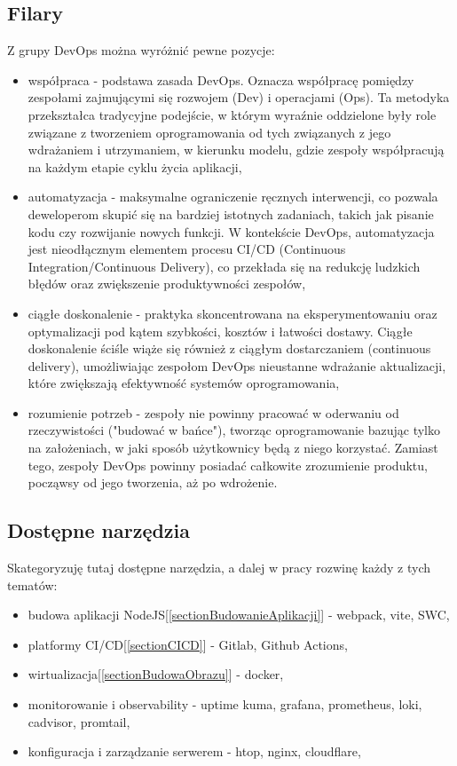 \documentclass{article}
\begin{document}
\subsection{Filary}
Z grupy DevOps można wyróżnić pewne pozycje:
\begin{itemize}
    \item współpraca - podstawa zasada DevOps. Oznacza współpracę pomiędzy zespołami zajmującymi się rozwojem (Dev) i operacjami (Ops). Ta metodyka przekształca tradycyjne podejście, w którym wyraźnie oddzielone były role związane z tworzeniem oprogramowania od tych związanych z jego wdrażaniem i utrzymaniem, w kierunku modelu, gdzie zespoły współpracują na każdym etapie cyklu życia aplikacji,
    \item automatyzacja - maksymalne ograniczenie ręcznych interwencji, co pozwala deweloperom skupić się na bardziej istotnych zadaniach, takich jak pisanie kodu czy rozwijanie nowych funkcji. W kontekście DevOps, automatyzacja jest nieodłącznym elementem procesu CI/CD (Continuous Integration/Continuous Delivery), co przekłada się na redukcję ludzkich błędów oraz zwiększenie produktywności zespołów,
    \item ciągłe doskonalenie - praktyka skoncentrowana na eksperymentowaniu oraz optymalizacji pod kątem szybkości, kosztów i łatwości dostawy. Ciągłe doskonalenie ściśle wiąże się również z ciągłym dostarczaniem (continuous delivery), umożliwiając zespołom DevOps nieustanne wdrażanie aktualizacji, które zwiększają efektywność systemów oprogramowania,
    \item rozumienie potrzeb - zespoły nie powinny pracować w oderwaniu od rzeczywistości ("budować w bańce"), tworząc oprogramowanie bazując tylko na założeniach, w jaki sposób użytkownicy będą z niego korzystać. Zamiast tego, zespoły DevOps powinny posiadać całkowite zrozumienie produktu, począwsy od jego tworzenia, aż po wdrożenie.
\end{itemize}

\subsection{Dostępne narzędzia}

Skategoryzuję tutaj dostępne narzędzia, a dalej w pracy rozwinę każdy z tych tematów:

\begin{itemize}
    \item budowa aplikacji NodeJS[\ref{sectionBudowanieAplikacji}] - webpack, vite, SWC,
    \item platformy CI/CD[\ref{sectionCICD}] - Gitlab, Github Actions,
    \item wirtualizacja[\ref{sectionBudowaObrazu}] - docker,
    \item monitorowanie i observability - uptime kuma, grafana, prometheus, loki, cadvisor, promtail,
    \item konfiguracja i zarządzanie serwerem - htop, nginx, cloudflare,
\end{itemize}
\end{document}
